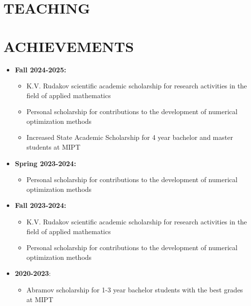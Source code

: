 \documentclass[11pt,a4paper]{moderncv}
\begin{document}
\section{TEACHING}

\section{ACHIEVEMENTS}
\begin{itemize}
    \item \textbf{Fall 2024-2025:}
    \begin{itemize}
        \item K.V. Rudakov scientific academic scholarship for research activities in the field of applied mathematics
        \item Personal scholarship for contributions to the development of numerical optimization methods
        \item Increased State Academic Scholarship for 4 year bachelor and master students at MIPT
    \end{itemize}
    \item \textbf{Spring 2023-2024:}
    \begin{itemize}
        \item Personal scholarship for contributions to the development of numerical optimization methods
    \end{itemize}
    \item \textbf{Fall 2023-2024:}
    \begin{itemize}
        \item K.V. Rudakov scientific academic scholarship for research activities in the field of applied mathematics
        \item Personal scholarship for contributions to the development of numerical optimization methods
    \end{itemize}
    \item \textbf{2020-2023}:
    \begin{itemize}
        \item Abramov scholarship for 1-3 year bachelor students with the best grades at MIPT
    \end{itemize}
\end{itemize}
\end{document}
